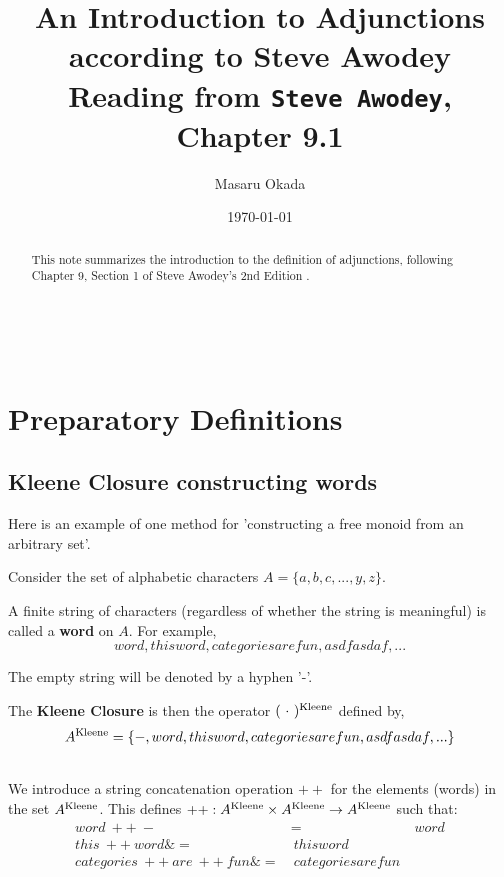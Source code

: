 \documentclass[uplatex,a4j,12pt,dvipdfmx]{jsarticle}
\title{
An Introduction to Adjunctions according to Steve Awodey \\
\normalsize Reading from \texttt{Steve Awodey}, Chapter 9.1
}
\author{Masaru Okada}
\date{\today}
\begin{document}
\maketitle

\begin{abstract}
	This note summarizes the introduction to the definition of adjunctions, following Chapter 9, Section 1 of Steve Awodey's 2nd Edition \cite{Awodey}.
\end{abstract}

\tableofcontents

\ \\

\section{Preparatory Definitions}

\subsection{Kleene Closure constructing words}

Here is an example of one method for 'constructing a free monoid from an arbitrary set'.

Consider the set of alphabetic characters $A = \{ a,b,c,...,y,z \}$.

A finite string of characters (regardless of whether the string is meaningful) is called a \textbf{word} on $A$.
For example,
$$
	word, thisword, categoriesarefun, asdfasdaf, ...
$$

The empty string will be denoted by a hyphen '-'.

The \textbf{Kleene Closure} is then the operator $( \ \cdot \ )^{\rm Kleene}$ defined by,
$$
	A^{\rm Kleene} = \{ -, word, thisword, categoriesarefun, asdfasdaf, ... \}
$$

\ \\

We introduce a string concatenation operation $++$ for the elements (words) in the set $A^{\rm Kleene}$.
This defines $++ : A^{\rm Kleene} \times A^{\rm Kleene} \to A^{\rm Kleene}$ such that:
\[
	\begin{array}{rcl}
		word \ ++ \ - \                       & =                  & \ word \\
		this \ ++ \ word \& =                 & \ thisword                  \\
		categories \ ++ \ are \ ++ \ fun \& = & \ categoriesarefun
	\end{array}
\]
\end{document}
